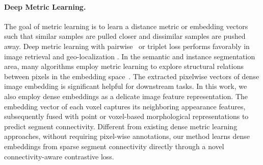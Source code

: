  \paragraph{Deep Metric Learning.}
The goal of metric learning is to learn a distance metric or embedding vectors such that similar samples are pulled closer and dissimilar samples are pushed away. Deep metric learning with pairwise~\cite{hadsell2006dimensionality} or triplet loss \cite{schroff2015facenet} performs favorably in image retrieval \cite{yang2018retrieving} and geo-localization \cite{shi2020optimal}. In the semantic and instance segmentation area, many algorithms employ metric learning to explore structural relations between pixels in the embedding space~\cite{zhou2022rethinking, lee2021learning, Wang_2021_ICCV}. The extracted pixelwise vectors of dense image embedding is significant helpful for downstream tasks. In this work, we also employ dense embeddings as a delicate image feature representation. The embedding vector of each voxel captures its neighboring appearance features, subsequently fused with point or voxel-based morphological representations to predict segment connectivity. Different from existing dense metric learning approaches, without requiring pixel-wise annotations, our method learns dense embeddings from sparse segment connectivity directly through a novel connectivity-aware contrastive loss. 

